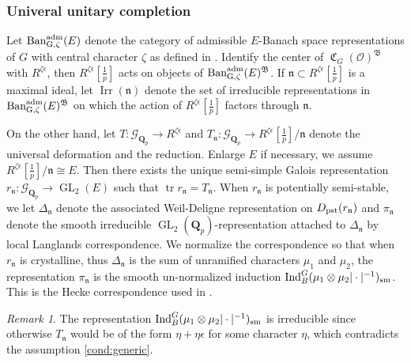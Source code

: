 \documentclass[leqno]{amsart}
\theoremstyle{definition}
\theoremstyle{remark}
\newtheorem{rem}[thm]{Remark}
\newcommand{\oo}{\mathcal{O}}
\newcommand{\Qp}{\mathbf{Q}_p}
\DeclareMathOperator{\Ind}{Ind}
\DeclareMathOperator{\GL}{GL}
\DeclareMathOperator{\mtr}{tr}
\newcommand{\pst}{\textnormal{pst}}
\newcommand{\fn}{\mathfrak{n}}
\DeclareMathOperator{\fC}{\mathfrak{C}} %
\DeclareMathOperator{\Ban}{\textnormal{Ban}_{G,\zeta}^{\adm}}
\DeclareMathOperator{\Irr}{Irr}
\newcommand{\Gp}{\mathcal{G}_{\Qp}} %
\newcommand{\B}{\mathfrak B} %
\newcommand{\sm}{\textnormal{sm}}
\newcommand{\adm}{\textnormal{adm}}
\begin{document}
\subsubsection{Univeral unitary completion}

Let $\Ban(E)$
denote the category of admissible $E$-Banach space
representations of $G$ with central character $\zeta$
as defined in \cite{pask}.
Identify the center of $\fC_G(\oo)^\B$ with $R^{\zeta\epsilon}$,
then $R^{\zeta\epsilon}[\frac{1}{p}]$ acts on objects of $\Ban(E)^{\B}$.
If $\fn\subset R^{\zeta\epsilon}[\frac{1}{p}]$ 
is a maximal ideal,
let $\Irr(\fn)$ denote the set of
irreducible representations in  $\Ban(E)^{\B}$
on which the action of $R^{\zeta\epsilon}[\frac{1}{p}]$ 
factors through $\fn$.

On the other hand,
let $T\colon \Gp\to R^{\zeta\epsilon}$ 
and $T_\fn\colon \Gp\to R^{\zeta\epsilon}[\frac{1}{p}]/\fn$ 
denote the universal deformation and 
the reduction.
Enlarge $E$ if necessary,
we assume $R^{\zeta\epsilon}[\frac{1}{p}]/\fn\cong E$.
Then there exists 
the unique semi-simple Galois representation
$r_{\fn}\colon \Gp\to \GL_2(E)$
such that $\mtr r_{\fn}=T_{\fn}$.
When $r_\fn$ is potentially semi-stable,
we let $\Delta_{\fn}$ denote
the associated Weil-Deligne representation 
on $D_{\pst}(r_\fn)$
and $\pi_{\fn}$ denote the smooth irreducible
$\GL_2(\Qp)$-representation attached to $\Delta_{\fn}$
by local Langlands correspondence.
We normalize the correspondence so that 
when $r_{\fn}$ is crystalline, 
thus $\Delta_{\fn}$
is the sum of unramified characters $\mu_1$ and $\mu_2$,
the representation $\pi_\fn$ 
is the smooth un-normalized induction
$\Ind_B^G(\mu_1\otimes\mu_2|\cdot|^{-1})_{\sm}$.
This is the Hecke correspondence used in \cite{pan}.

\begin{rem}
	The representation 
	$\Ind_B^G(\mu_1\otimes\mu_2|\cdot|^{-1})_{\sm}$
	is irreducible since otherwise
	$T_\fn$ would be of the form
	$\eta+\eta\epsilon$ for some character  $\eta$,
    which contradicts 
    the assumption \eqref{cond:generic}.
\end{rem}
\end{document}
